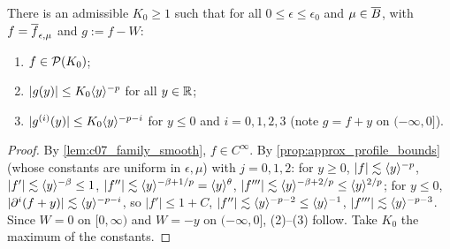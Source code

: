 \begin{lemma}
  \label{lem:c07_family_uniform_bounds}
  There is an admissible $K_0\ge1$ such that for all $0\le\epsilon\le\epsilon_0$ and $\mu\in\overline{B}$, with
  $f=\overline{f}_{\epsilon,\mu}$ and $g:=f-W$:
  \begin{enumerate}
    \item $f\in\mathcal{P}(K_0)$;
    \item $|g(y)|\le K_0\langle y \rangle^{-p}$ for all $y\in\mathbb{R}$;
    \item $|g^{(i)}(y)|\le K_0\langle y \rangle^{-p-i}$ for $y\le0$ and $i=0,1,2,3$ (note $g=f+y$ on $(-\infty,0]$).
  \end{enumerate}
\end{lemma}
\begin{proof}
  By \cref{lem:c07_family_smooth}, $f\in C^\infty$. By \cref{prop:approx_profile_bounds} (whose constants
  are uniform in $\epsilon,\mu$) with $j=0,1,2$: for $y\ge0$, $|f|\lesssim\langle y \rangle^{-p}$,
  $|f'|\lesssim\langle y \rangle^{-\beta}\le1$, $|f''|\lesssim\langle y \rangle^{-\beta+1/p}=\langle y \rangle^\theta$,
  $|f'''|\lesssim\langle y \rangle^{-\beta+2/p}\le\langle y \rangle^{2/p}$; for $y\le0$, $|\partial^i(f+y)|\lesssim\langle y \rangle^{-p-i}$,
  so $|f'|\le1+C$, $|f''|\lesssim\langle y \rangle^{-p-2}\le\langle y \rangle^{-1}$, $|f'''|\lesssim\langle y \rangle^{-p-3}$. Since
  $W=0$ on $[0,\infty)$ and $W=-y$ on $(-\infty,0]$, (2)--(3) follow. Take $K_0$ the maximum of the constants.
\end{proof}

